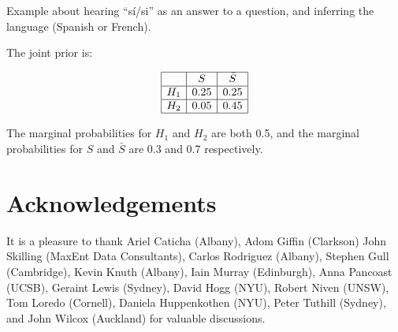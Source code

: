 \documentclass[a4paper, 11pt]{article}
\begin{document}
Example about hearing ``sí/si'' as an answer to a question,
and inferring the language (Spanish or French).

The joint prior is:

\begin{eqnarray}
\begin{array}{|c|c|c|}
\hline
	&	S	& \bar{S}\\
\hline
H_1 & 0.25  & 0.25\\
\hline
H_2 & 0.05 & 0.45\\
\hline
\end{array}
\end{eqnarray}

The marginal probabilities for $H_1$ and $H_2$ are both 0.5, and the
marginal probabilities for $S$ and $\bar{S}$ are 0.3 and 0.7 respectively.



\section*{Acknowledgements}
It is a pleasure to thank
Ariel Caticha (Albany),
Adom Giffin (Clarkson)
John Skilling (MaxEnt Data Consultants),
Carlos Rodriguez (Albany),
Stephen Gull (Cambridge),
Kevin Knuth (Albany),
Iain Murray (Edinburgh),
Anna Pancoast (UCSB),
Geraint Lewis (Sydney),
David Hogg (NYU),
Robert Niven (UNSW),
Tom Loredo (Cornell),
Daniela Huppenkothen (NYU),
Peter Tuthill (Sydney),
and John Wilcox (Auckland)
for valuable discussions.
\end{document}
